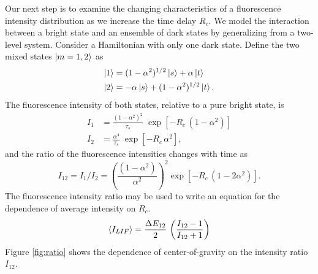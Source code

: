 \documentclass[12pt,draft]{mitthesis}
\begin{document}
Our next step is to examine the changing characteristics of a
fluorescence intensity distribution as we increase the time delay
$R_c$.  We model the interaction between a bright state and an
ensemble of dark states by generalizing from a two-level system.
Consider a Hamiltonian with only one dark state.  Define the two mixed
states $\mathinner{|{m=1,2}\rangle}$ as
\begin{equation}
  \begin{split}
    \mathinner{|{1}\rangle} &=  (1 - \alpha^2)^{1/2} \mathinner{|{s}\rangle} + \alpha \mathinner{|{t}\rangle}\\
    \mathinner{|{2}\rangle} &= -\alpha \mathinner{|{s}\rangle} + (1 - \alpha^2)^{1/2} \mathinner{|{t}\rangle}.
  \end{split}
\end{equation}
The fluorescence intensity of both states, relative to a pure bright
state, is
\begin{equation}
  \begin{split}
    I_1 &= \frac{(1 - \alpha^2)^2}{\tau_s} \; \exp 
          \left[
            - R_c \, (1 - \alpha^2)
          \right]\\
    I_2 &= \frac{\alpha^4}{\tau_s} \; \exp 
          \left[
            - R_c \, \alpha^2
          \right],
  \end{split}
\end{equation}
and the ratio of the fluorescence intensities changes with time as
\begin{equation}
  I_{12} = I_1 / I_2 = 
  \left(
    \frac{(1 - \alpha^2)}{\alpha^2}
  \right)^2
  \exp
  \left[
    - R_c \, (1 - 2\alpha^2)
  \right].
\end{equation}
The fluorescence intensity ratio may be used to write an equation for
the dependence of average intensity on $R_c$.
\begin{equation}
  \label{eq:ratio}
  \mathinner{\langle{I_{LIF}}\rangle} = 
  \frac{\Delta E_{12}}{2} \,
  \left(
    \frac{I_{12}-1}{I_{12}+1}
  \right)
\end{equation}
Figure \ref{fig:ratio} shows the dependence of center-of-gravity on
the intensity ratio $I_{12}$.
\end{document}
